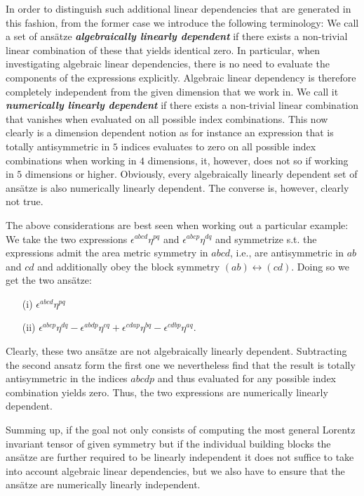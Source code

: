 In order to distinguish such additional linear dependencies that are generated in this fashion, from the former case we introduce the following terminology: We call a set of ansätze \textit{\textbf{algebraically linearly dependent}} if there exists a non-trivial linear combination of these that yields identical zero. In particular, when investigating algebraic linear dependencies, there is no need to evaluate the components of the expressions explicitly. Algebraic linear dependency is therefore completely  independent from the given dimension that we work in. We call it \textbf{\textit{numerically linearly dependent}} if there exists a non-trivial linear combination that vanishes when evaluated on all possible index combinations. This now clearly is a dimension dependent notion as for instance an expression that is totally antisymmetric in $5$ indices evaluates to zero on all possible index combinations when working in $4$ dimensions, it, however, does not so if working in $5$ dimensions or higher. Obviously, every algebraically linearly dependent set of ansätze is also numerically linearly dependent. The converse is, however, clearly not true. 

The above considerations are best seen when working out a particular example: We take the two expressions $\epsilon^{abcd} \eta^{pq}$ and $\epsilon^{abcp} \eta^{dq}$ and symmetrize s.t. the expressions admit the area metric symmetry in $abcd$, i.e., are antisymmetric in $ab$ and $cd$ and additionally obey the block symmetry $(ab) \leftrightarrow (cd)$. Doing so we get the two ansätze: 
\begin{itemize}
\item[(i)] $\epsilon^{abcd} \eta^{pq}$ 
\item[(ii)] $\epsilon^{abcp} \eta^{dq} - \epsilon^{abdp} \eta^{cq} + \epsilon^{cdap} \eta^{bq} - \epsilon^{cdbp} \eta^{aq}$.
\end{itemize}
Clearly, these two ansätze are not algebraically linearly dependent. Subtracting the second ansatz form the first one we nevertheless find that the result is totally antisymmetric in the indices $abcdp$ and thus evaluated for any possible index combination yields zero. Thus, the two expressions are numerically linearly dependent.

Summing up, if the goal not only consists of computing the most general Lorentz invariant tensor of given symmetry but if the individual building blocks the ansätze are further required to be linearly independent it does not suffice to take into account algebraic linear dependencies, but we also have to ensure that the ansätze are numerically linearly independent.  

